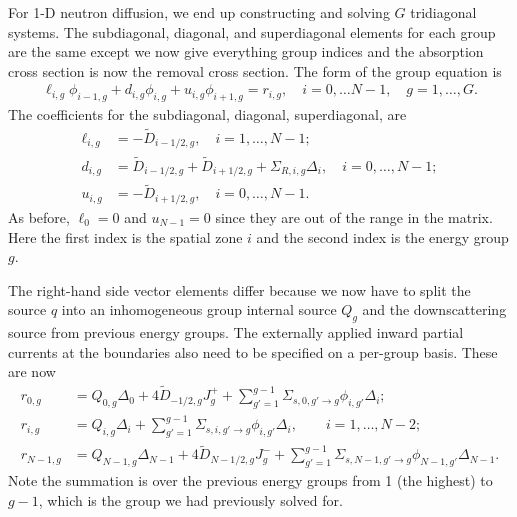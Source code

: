 For 1-D neutron diffusion, we end up constructing and solving $G$ tridiagonal systems. The subdiagonal, diagonal, and superdiagonal elements for each group are the same except we now give everything group indices and the absorption cross section is now the removal cross section. The form of the group equation is
\begin{align}
  \ell_{i,g} \phi_{i-1,g} + d_{i,g} \phi_{i,g} + u_{i,g} \phi_{i+1,g} = r_{i,g} , \quad i = 0, \ldots N-1, \quad g = 1, \ldots, G.
\end{align}
The coefficients for the subdiagonal, diagonal, superdiagonal, are
\begin{subequations}
\begin{align}
  \ell_{i,g}	&= -\widetilde{D}_{i-1/2,g}, \quad i = 1, \ldots, N-1; \\
  d_{i,g}		&=  \widetilde{D}_{i-1/2,g} + \widetilde{D}_{i+1/2,g}  + \Sigma_{R,i,g} \Delta_i, \quad i = 0, \ldots, N-1; \\
  u_{i,g}		&= -\widetilde{D}_{i+1/2,g}, \quad i = 0, \ldots, N-1.
\end{align} 
\end{subequations}
As before, $\ell_0 = 0$ and $u_{N-1} = 0$ since they are out of the range in the matrix. Here the first index is the spatial zone $i$ and the second index is the energy group $g$. 

The right-hand side vector elements differ because we now have to split the source $q$ into an inhomogeneous group internal source $Q_g$ and the downscattering source from previous energy groups. The externally applied inward partial currents at the boundaries also need to be specified on a per-group basis. These are now
\begin{subequations}
\begin{align}
  r_{0,g}		&= Q_{0,g} \Delta_0 + 4 \widetilde{D}_{-1/2,g} J_g^+ + \sum_{g'=1}^{g-1} \Sigma_{s,0,g' \rightarrow g} \phi_{i,g'} \Delta_i; \\
  r_{i,g}		&= Q_{i,g} \Delta_i + \sum_{g'=1}^{g-1} \Sigma_{s,i,g' \rightarrow g} \phi_{i,g'} \Delta_i, \qquad i = 1, \ldots, N-2; \\
  r_{N-1,g}		&= Q_{N-1,g} \Delta_{N-1} + 4 \widetilde{D}_{N-1/2,g} J_g^- + \sum_{g'=1}^{g-1} \Sigma_{s,N-1,g' \rightarrow g} \phi_{N-1,g'} \Delta_{N-1} .
\end{align} 
\end{subequations}
Note the summation is over the previous energy groups from 1 (the highest) to $g-1$, which is the group we had previously solved for. 


